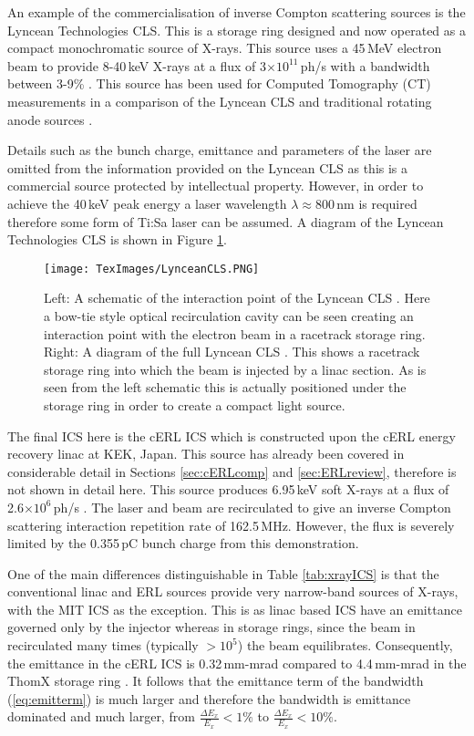 \documentclass[11pt]{article}
\begin{document}
An example of the commercialisation of inverse Compton scattering sources is the Lyncean Technologies CLS. This is a storage ring designed and now operated as a compact monochromatic source of X-rays. This source uses a 45\,MeV electron beam to provide 8-40\,keV X-rays at a flux of 3$\times 10^{11}$\,ph/s with a bandwidth between 3-9\% \cite{LynceanCLS}. This source has been used for Computed Tomography (CT) measurements in a comparison of the Lyncean CLS and traditional rotating anode sources \cite{CLSCT}.

Details such as the bunch charge, emittance and parameters of the laser are omitted from the information provided on the Lyncean CLS\cite{LynceanCLS} as this is a commercial source protected by intellectual property. However, in order to achieve the 40\,keV peak energy a laser wavelength $\lambda \approx 800$\,nm is required therefore some form of Ti:Sa laser can be assumed. A diagram of the Lyncean Technologies CLS is shown in Figure \ref{fig:CLSdiag}.

\begin{figure}[H]
\centering
\texttt{[image: TexImages/LynceanCLS.PNG]}
\caption{\label{fig:CLSdiag} Left: A schematic of the interaction point of the Lyncean CLS \cite{CompSourceEM}. Here a bow-tie style optical recirculation cavity can be seen creating an interaction point with the electron beam in a racetrack storage ring. Right: A diagram of the full Lyncean CLS \cite{LynceanCLS}. This shows a racetrack storage ring into which the beam is injected by a linac section. As is seen from the left schematic this is actually positioned under the storage ring in order to create a compact light source.}
\end{figure} 
 
The final ICS here is the cERL ICS which is constructed upon the cERL energy recovery linac at KEK, Japan. This source has already been covered in considerable detail in Sections \ref{sec:cERLcomp} and \ref{sec:ERLreview}, therefore is not shown in detail here. This source produces 6.95\,keV soft X-rays at a flux of 2.6$\times 10^{6}$\,ph/s \cite{TAkagicERL}. The laser and beam are recirculated to give an inverse Compton scattering interaction repetition rate of 162.5\,MHz. However, the flux is severely limited by the 0.355\,pC bunch charge from this demonstration.

One of the main differences distinguishable in Table \ref{tab:xrayICS} is that the conventional linac and ERL sources provide very narrow-band sources of X-rays, with the MIT ICS as the exception. This is as  linac based ICS have an emittance governed only by the injector whereas in storage rings, since the beam in recirculated many times (typically $ > 10^{5}$) the beam equilibrates. Consequently, the emittance in the cERL ICS is 0.32\,mm-mrad compared to 4.4\,mm-mrad in the ThomX storage ring \cite{ThomXTDR}. It follows that the emittance term of the bandwidth (\ref{eq:emitterm}) is much larger and therefore the bandwidth is emittance dominated and much larger, from $\frac{\Delta E_{x}}{E_{x}} < 1\%$ to $\frac{\Delta E_{x}}{E_{x}} < 10\%$.
\end{document}
